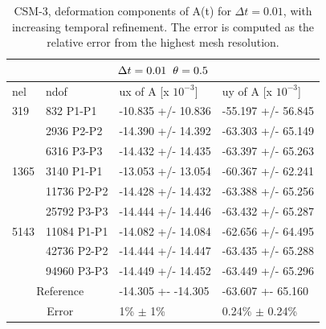 \begin{table}[h!]
\centering
\begin{tabular}{ |p{1cm}||p{2.7cm}|p{3.3cm}|p{3.3cm}|}
\hline
  \multicolumn{4}{|c|}{$\Delta t = 0.01 \hspace{2mm} \theta = 0.5$} \\
\hline
nel & ndof & ux of A [x $10^{-3}$]  &uy of A [x $10^{-3}$] \\
\hline
    319     & 832 P1-P1 & -10.835       +/-  10.836 & -55.197       +/-  56.845 \\
     & 2936 P2-P2 & -14.390       +/-  14.392 & -63.303       +/-  65.149 \\
      & 6316 P3-P3& -14.432       +/-  14.435 & -63.397       +/-  65.263 \\
    \hline
    1365    & 3140 P1-P1  & -13.053       +/-  13.054 & -60.367       +/-  62.241 \\
     & 11736 P2-P2  & -14.428       +/-  14.432 & -63.388       +/-  65.256 \\
     & 25792 P3-P3  & -14.444       +/-  14.446 & -63.432       +/-  65.287 \\
     \hline
     5143    & 11084 P1-P1 & -14.082       +/-  14.084 & -62.656       +/-  64.495 \\
     & 42736 P2-P2 & -14.444       +/-  14.447 & -63.435       +/-  65.288 \\
     & 94960 P3-P3& -14.449       +/-  14.452 & -63.449       +/-  65.296 \\
 \hline
  \multicolumn{2}{|c|}{Reference}  &-14.305 +- -14.305        & -63.607 +- 65.160    \\
   \hline
    \multicolumn{2}{|c|}{Error}  & 1\% $\pm$ 1\%   & 0.24\% $\pm$ 0.24\%\\
   \hline
\end{tabular}
\caption{CSM-3, deformation components of A(t) for $\Delta t = 0.01$, with increasing temporal refinement. The error is computed as the relative error from the highest mesh resolution.}
\label{table:csm31}
\end{table}

